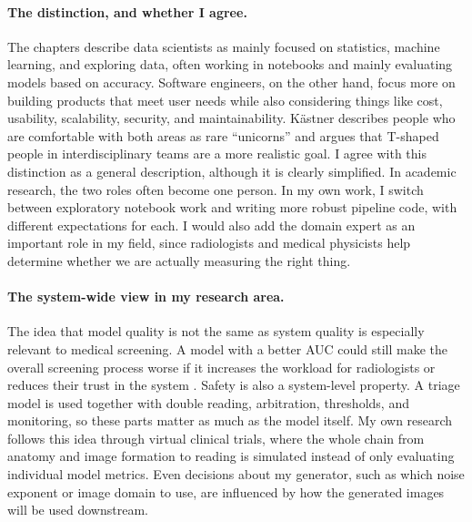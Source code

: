 \documentclass[11pt,a4paper]{article}
\begin{document}
\paragraph{The distinction, and whether I agree.}
The chapters describe data scientists as mainly focused on statistics, machine learning, and exploring data, often working in notebooks and mainly evaluating models based on accuracy. Software engineers, on the other hand, focus more on building products that meet user needs while also considering things like cost, usability, scalability, security, and maintainability. K\"astner describes people who are comfortable with both areas as rare ``unicorns'' and argues that T-shaped people in interdisciplinary teams are a more realistic goal. I agree with this distinction as a general description, although it is clearly simplified. In academic research, the two roles often become one person. In my own work, I switch between exploratory notebook work and writing more robust pipeline code, with different expectations for each. I would also add the domain expert as an important role in my field, since radiologists and medical physicists help determine whether we are actually measuring the right thing.

\paragraph{The system-wide view in my research area.}
The idea that model quality is not the same as system quality is especially relevant to medical screening. A model with a better AUC could still make the overall screening process worse if it increases the workload for radiologists or reduces their trust in the system \cite{bernardi}. Safety is also a system-level property. A triage model is used together with double reading, arbitration, thresholds, and monitoring, so these parts matter as much as the model itself. My own research follows this idea through virtual clinical trials, where the whole chain from anatomy and image formation to reading is simulated instead of only evaluating individual model metrics. Even decisions about my generator, such as which noise exponent or image domain to use, are influenced by how the generated images will be used downstream.
\end{document}
